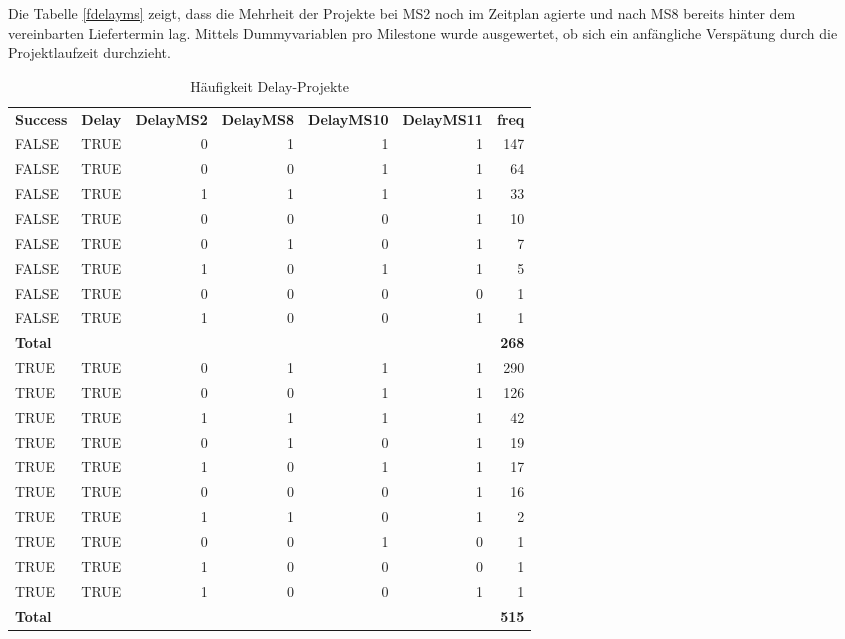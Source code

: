 Die Tabelle \ref{fdelayms} zeigt, dass die Mehrheit der Projekte bei MS2 noch im Zeitplan agierte und nach MS8 bereits hinter dem vereinbarten Liefertermin lag. Mittels Dummyvariablen pro Milestone wurde ausgewertet, ob sich ein anfängliche Verspätung durch die Projektlaufzeit durchzieht.
\begin{table}[H]
	\centering
	\caption{Häufigkeit Delay-Projekte}
	\begin{tabular}{lrrrrrr}
		\textbf{Success} & \multicolumn{1}{l}{\textbf{Delay}} & \multicolumn{1}{l}{\textbf{DelayMS2}} & \multicolumn{1}{l}{\textbf{DelayMS8}} & \multicolumn{1}{l}{\textbf{DelayMS10}} & \multicolumn{1}{l}{\textbf{DelayMS11}} & \multicolumn{1}{l}{\textbf{freq}} \\
		FALSE & \multicolumn{1}{l}{TRUE} & 0     & 1     & 1     & 1     & 147 \\
		FALSE & \multicolumn{1}{l}{TRUE} & 0     & 0     & 1     & 1     & 64 \\
		FALSE & \multicolumn{1}{l}{TRUE} & 1     & 1     & 1     & 1     & 33 \\
		FALSE & \multicolumn{1}{l}{TRUE} & 0     & 0     & 0     & 1     & 10 \\
		FALSE & \multicolumn{1}{l}{TRUE} & 0     & 1     & 0     & 1     & 7 \\
		FALSE & \multicolumn{1}{l}{TRUE} & 1     & 0     & 1     & 1     & 5 \\
		FALSE & \multicolumn{1}{l}{TRUE} & 0     & 0     & 0     & 0     & 1 \\
		FALSE & \multicolumn{1}{l}{TRUE} & 1     & 0     & 0     & 1     & 1 \\
		\textbf{Total} &       &       &       &       &       & \textbf{268} \\
		TRUE  & \multicolumn{1}{l}{TRUE} & 0     & 1     & 1     & 1     & 290 \\
		TRUE  & \multicolumn{1}{l}{TRUE} & 0     & 0     & 1     & 1     & 126 \\
		TRUE  & \multicolumn{1}{l}{TRUE} & 1     & 1     & 1     & 1     & 42 \\
		TRUE  & \multicolumn{1}{l}{TRUE} & 0     & 1     & 0     & 1     & 19 \\
		TRUE  & \multicolumn{1}{l}{TRUE} & 1     & 0     & 1     & 1     & 17 \\
		TRUE  & \multicolumn{1}{l}{TRUE} & 0     & 0     & 0     & 1     & 16 \\
		TRUE  & \multicolumn{1}{l}{TRUE} & 1     & 1     & 0     & 1     & 2 \\
		TRUE  & \multicolumn{1}{l}{TRUE} & 0     & 0     & 1     & 0     & 1 \\
		TRUE  & \multicolumn{1}{l}{TRUE} & 1     & 0     & 0     & 0     & 1 \\
		TRUE  & \multicolumn{1}{l}{TRUE} & 1     & 0     & 0     & 1     & 1 \\
		\textbf{Total} &       &       &       &       &       & \textbf{515} \\
	\end{tabular}%
	\label{tab:addlabel}%
\end{table}%
